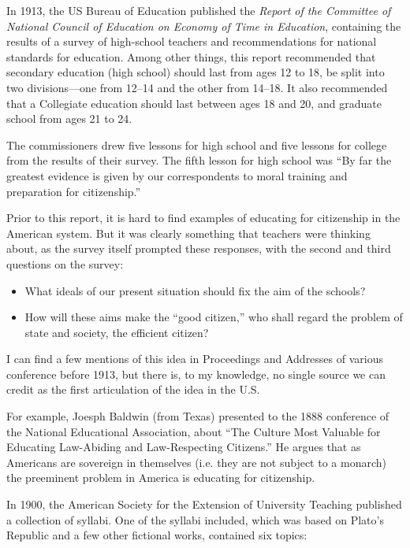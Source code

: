 In 1913, the US Bureau of Education published the \emph{Report of the Committee of National Council of Education on Economy of Time in Education}, containing the results of a survey of high-school teachers and recommendations for national standards for education. Among other things, this report recommended that secondary education (high school) should last from ages 12 to 18, be split into two divisions---one from 12--14 and the other from 14--18. It also recommended that a Collegiate education should last between ages 18 and 20, and graduate school from ages 21 to 24. 

The commissioners drew five lessons for high school and five lessons for college from the results of their survey. The fifth lesson for high school was ``By far the greatest evidence is given by our correspondents to moral training and preparation for citizenship.'' ~\citep[p. 16]{NationalCouncilofEducationCommitteeonEconomyofTimeinEducation:1913vu}

Prior to this report, it is hard to find examples of educating for citizenship in the American system. But it was clearly something that teachers were thinking about, as the survey itself prompted these responses, with the second and third questions on the survey:

\begin{itemize}
\item What ideals of our present situation should fix the aim of the schools?

\item How will these aims make the ``good citizen,'' who shall regard the problem of state and society, the efficient citizen? ~\citep[p. 36]{NationalCouncilofEducationCommitteeonEconomyofTimeinEducation:1913vu}

\end{itemize}

I can find a few mentions of this idea in Proceedings and Addresses of various conference before 1913, but there is, to my knowledge, no single source we can credit as the first articulation of the idea in the U.S.

For example, Joesph Baldwin (from Texas) presented to the 1888 conference of the National Educational Association, about ``The Culture Most Valuable for Educating Law-Abiding and Law-Respecting Citizens.'' He argues that as Americans are sovereign in themselves (i.e. they are not subject to a monarch) the preeminent problem in America is educating for citizenship. 

In 1900, the American Society for the Extension of University Teaching published a collection of syllabi. One of the syllabi included, which was based on Plato's Republic and a few other fictional works, contained six topics:

